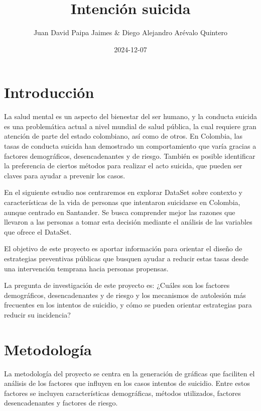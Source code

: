 \documentclass[
]{article}
\title{\textbf{Intención suicida}}
\author{Juan David Paipa Jaimes \& Diego Alejandro Arévalo Quintero}
\date{2024-12-07}
\begin{document}
\maketitle

{
\setcounter{tocdepth}{2}
\tableofcontents
}
\section{\texorpdfstring{\textbf{Introducción}}{Introducción}}\label{introducciuxf3n}

La salud mental es un aspecto del bienestar del ser humano, y la
conducta suicida es una problemática actual a nivel mundial de salud
pública, la cual requiere gran atención de parte del estado colombiano,
así como de otros. En Colombia, las tasas de conducta suicida han
demostrado un comportamiento que varía gracias a factores demográficos,
desencadenantes y de riesgo. También es posible identificar la
preferencia de ciertos métodos para realizar el acto suicida, que pueden
ser claves para ayudar a prevenir los casos.

En el siguiente estudio nos centraremos en explorar DataSet sobre
contexto y características de la vida de personas que intentaron
suicidarse en Colombia, aunque centrado en Santander. Se busca
comprender mejor las razones que llevaron a las personas a tomar esta
decisión mediante el análisis de las variables que ofrece el DataSet.

El objetivo de este proyecto es aportar información para orientar el
diseño de estrategias preventivas públicas que busquen ayudar a reducir
estas tasas desde una intervención temprana hacia personas propensas.

La pregunta de investigación de este proyecto es: ¿Cuáles son los
factores demográficos, desencadenantes y de riesgo y los mecanismos de
autolesión más frecuentes en los intentos de suicidio, y cómo se pueden
orientar estrategias para reducir su incidencia?

\section{\texorpdfstring{\textbf{Metodología}}{Metodología}}\label{metodologuxeda}

La metodología del proyecto se centra en la generación de gráficas que
faciliten el análisis de los factores que influyen en los casos intentos
de suicidio. Entre estos factores se incluyen características
demográficas, métodos utilizados, factores desencadenantes y factores de
riesgo.
\end{document}
